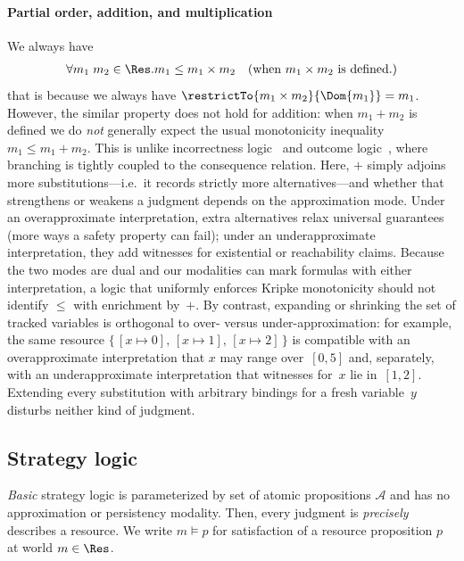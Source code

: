 \paragraph{Partial order, addition, and multiplication} We always have
\begin{align*}
  \forall m_1\;m_2 \in \Res. m_1 \leq m_1 \times m_2 \quad (\text{when } m_1 \times m_2 \text{ is defined.})
\end{align*}
that is because we always have $\restrictTo{m_1 \times m_2}{\Dom{m_1}} = m_1$. However, the similar property does not hold for addition: when $m_1 + m_2$ is defined we do \emph{not}
generally expect the usual monotonicity inequality
$m_1 \leq m_1 + m_2$.
This is unlike incorrectness logic~\cite{OHP19} and outcome
logic~\cite{ZDS23,Zil25TOPLAS}, where branching is tightly coupled to
the consequence relation.
Here, $+$ simply adjoins more substitutions---i.e.\ it records strictly
more alternatives---and whether that strengthens or weakens a
judgment depends on the approximation mode.
Under an overapproximate interpretation, extra alternatives relax universal
guarantees (more ways a safety property can fail); under an
underapproximate interpretation, they add witnesses for existential or
reachability claims.
Because the two modes are dual and our modalities can mark formulas
with either interpretation, a logic that uniformly enforces Kripke monotonicity
should not identify $\leq$ with enrichment by~$+$.
By contrast, expanding or shrinking the set of tracked variables is
orthogonal to over- versus under-approximation: for example, the same
resource
$\{\,[x \mapsto 0],\, [x \mapsto 1],\, [x \mapsto 2]\,\}$
is compatible with an overapproximate interpretation that $x$ may range
over~$[0,5]$ and, separately, with an underapproximate interpretation that
witnesses for~$x$ lie in~$[1,2]$.
Extending every substitution with arbitrary bindings for a fresh
variable~$y$ disturbs neither kind of judgment.

\subsection{Strategy logic}

\emph{Basic} strategy logic is parameterized by set of atomic propositions $\mathcal{A}$ and has no approximation or persistency modality. Then, every judgment is \emph{precisely} describes a resource.
We write $m \models p$ for satisfaction of a resource proposition $p$
at world $m \in \Res$.

